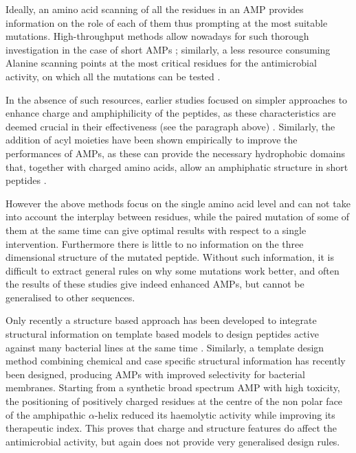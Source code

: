 Ideally, an amino acid scanning of all the residues in an AMP provides information on the role of each of them thus prompting at the most suitable mutations. High-throughput methods allow nowadays for such thorough investigation in the case of short AMPs \cite{Hilpert2005,Hilpert2006}; similarly, a less resource consuming Alanine scanning points at the most critical residues for the antimicrobial activity, on which all the mutations can be tested \cite{Migon2018,Grieco2011,Xie2018}.

In the absence of such resources, earlier studies focused on simpler approaches to enhance charge and amphiphilicity of the peptides, as these characteristics are deemed crucial in their effectiveness (see the paragraph above) \cite{Wiradharma2011,Huang2010,Pag2008,Wang2015}.
%
Similarly, the addition of acyl moieties have been shown empirically to improve the performances of AMPs, as these can provide the necessary hydrophobic domains that, together with charged amino acids, allow an amphiphatic structure in short pep­tides \cite{Radzishevsky2005,Serrano2009,Avrahami2004}.

However the above methods focus on the single amino acid level and can not take into account the interplay between residues, while the paired mutation of some of them at the same time can give optimal results with respect to a single intervention.
%
Furthermore there is little to no information on the three dimensional structure of the mutated peptide. Without such information, it is difficult to extract general rules on why some mutations work better, and often the results of these studies give indeed enhanced AMPs, but cannot be generalised to other sequences.

Only recently a structure based approach has been developed to integrate structural information on template based models to design peptides active against many bacterial lines at the same time \cite{Liu2018}.
%
Similarly, a template design method combining chemical and case specific structural information \cite{Jiang2011} has recently been designed, producing AMPs with improved selectivity for bacterial membranes. Starting from a synthetic broad spectrum AMP with high toxicity, the positioning of positively charged residues at the centre of the non polar face of the amphipathic $\alpha$-helix reduced its haemolytic activity while improving its therapeutic index. This proves that charge and structure features do affect the antimicrobial activity, but again does not provide very generalised design rules.

